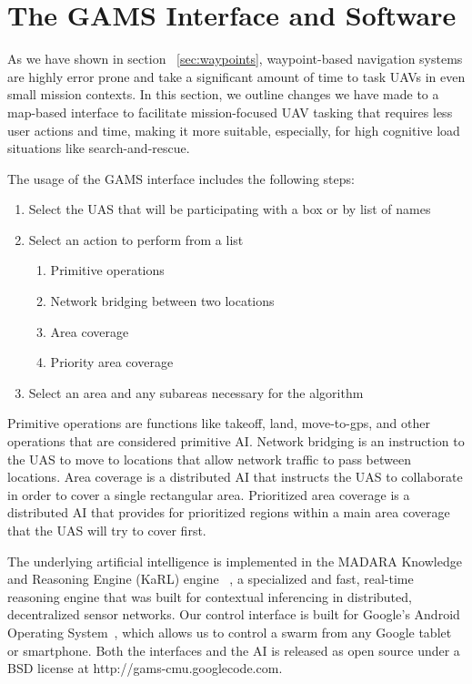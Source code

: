 \documentclass{sig-alternate-ipsn13}
\begin{document}
\section{The GAMS Interface and Software}
\label{sec:gamsinterface}

As we have shown in section ~\ref{sec:waypoints}, waypoint-based
navigation systems are highly error prone and take a significant amount
of time to task UAVs in even small mission contexts. In this section, we
outline changes we have made to a map-based interface to facilitate
mission-focused UAV tasking that requires less user actions and time,
making it more suitable, especially, for high cognitive load situations like
search-and-rescue.

The usage of the GAMS interface includes the following steps:
\begin{enumerate}
  \item Select the UAS that will be participating with a box or by list of names
  \item Select an action to perform from a list
  \begin{enumerate}
    \item Primitive operations
    \item Network bridging between two locations
    \item Area coverage
    \item Priority area coverage
  \end{enumerate}
  \item Select an area and any subareas necessary for the algorithm
\end{enumerate}

Primitive operations are functions like takeoff, land, move-to-gps, and other
operations that are considered primitive AI. Network bridging is an instruction
to the UAS to move to locations that allow network traffic to pass between
locations. Area coverage is a distributed AI that instructs the UAS to collaborate
in order to cover a single rectangular area. Prioritized area coverage is a distributed AI
that provides for prioritized regions within a main area coverage
that the UAS will try to cover first.

The underlying artificial intelligence is implemented in the MADARA Knowledge and
Reasoning Engine (KaRL) engine ~\cite{Edmondson-KaRL-ksem2011}, a specialized
and fast, real-time reasoning engine that was built for contextual inferencing in
distributed, decentralized sensor networks. Our control interface is built for Google's
Android Operating System~\cite{nimodia2012android}, which allows us to control a swarm from any Google
tablet or smartphone. Both the interfaces and the AI is released as open source under a BSD license
at http://gams-cmu.googlecode.com.
\end{document}
